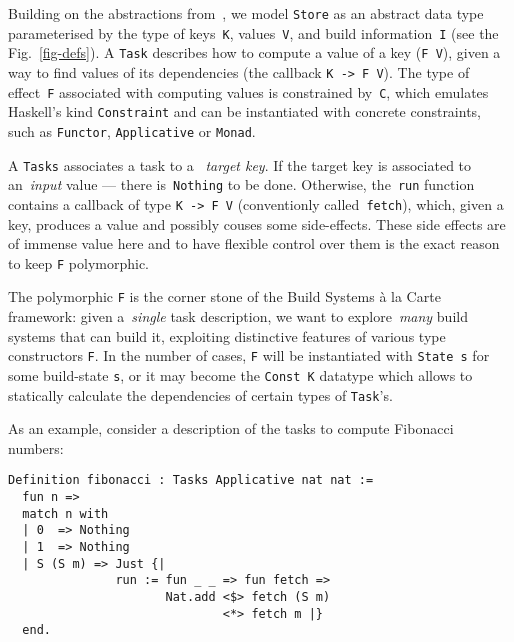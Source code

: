 \documentclass[sigplan,review]{acmart}\settopmatter{printfolios=true,printccs=false,printacmref=false}
\newcommand{\hs}{\texttt}
\begin{document}

Building on the abstractions from~\cite{Mokhov2018icfp}, we model \hs{Store} as
an abstract data type parameterised by the type of keys~\hs{K}, values~\hs{V},
and build information~\hs{I} (see the Fig.~\ref{fig-defs}). A \hs{Task}
describes how to compute a value of a key (\hs{F V}), given a way to find values
of its dependencies (the callback \hs{K -> F V}). The type of effect~\hs{F}
associated with computing values is constrained by~\hs{C}, which emulates
Haskell's kind \hs{Constraint} and can be instantiated with concrete constraints,
such as \hs{Functor}, \hs{Applicative} or \hs{Monad}.

A \hs{Tasks} associates a task to a ~\emph{target key}.
If the target key is associated to an~\emph{input}
value --- there is~\hs{Nothing} to be done. Otherwise, the~\hs{run} function
contains a callback of type \hs{K -> F V} (conventionly called~\hs{fetch}),
which, given a key, produces a value and possibly couses some side-effects.
These side effects are of immense value here and to have flexible control over them
is the exact reason to keep \hs{F} polymorphic.

The polymorphic \hs{F} is the corner stone of the Build Systems \`a la Carte
framework: given a~\emph{single} task description, we want to explore~\emph{many}
build systems that can build it, exploiting distinctive features of various
type constructors \hs{F}. In the number of cases, \hs{F} will be instantiated
with \hs{State s} for some build-state \hs{s}, or it may become the
\hs{Const K} datatype which allows to statically calculate the dependencies of certain
types of \hs{Task}'s.

As an example, consider a description of the tasks to compute Fibonacci numbers:

\vspace{-1mm}
\begin{verbatim}
Definition fibonacci : Tasks Applicative nat nat :=
  fun n =>
  match n with
  | 0  => Nothing
  | 1  => Nothing
  | S (S m) => Just {|
               run := fun _ _ => fun fetch =>
                      Nat.add <$> fetch (S m)
                              <*> fetch m |}
  end.
\end{verbatim}
\vspace{-1mm}
\end{document}
